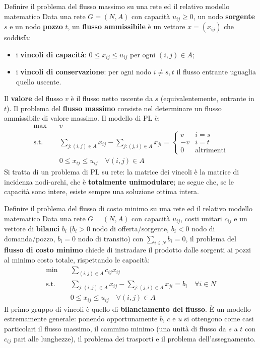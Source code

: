 \documentclass[12pt]{extarticle} %
\begin{document}
\begin{teoriabox}{Definire il problema del flusso massimo su una rete ed il relativo modello matematico}
Data una rete $G=(N,A)$ con capacità $u_{ij} \ge 0$, un nodo \textbf{sorgente} $s$ e un nodo \textbf{pozzo} $t$, un \textbf{flusso ammissibile} è un vettore $x = (x_{ij})$ che soddisfa:
\begin{itemize}
    \item i \textbf{vincoli di capacità}: $0 \le x_{ij} \le u_{ij}$ per ogni $(i,j) \in A$;
    \item i \textbf{vincoli di conservazione}: per ogni nodo $i \ne s,t$ il flusso entrante uguaglia quello uscente.
\end{itemize}
Il \textbf{valore} del flusso $v$ è il flusso netto uscente da $s$ (equivalentemente, entrante in $t$). Il problema del \textbf{flusso massimo} consiste nel determinare un flusso ammissibile di valore massimo. Il modello di PL è:
\[
\begin{aligned}
\max \quad & v \\
\text{s.t.} \quad & \sum_{j:(i,j)\in A} x_{ij} - \sum_{j:(j,i)\in A} x_{ji} =
\begin{cases}
v & i = s\\
-v & i = t\\
0 & \text{altrimenti}
\end{cases} \\
& 0 \le x_{ij} \le u_{ij} \quad \forall (i,j) \in A
\end{aligned}
\]
Si tratta di un problema di PL su rete: la matrice dei vincoli è la matrice di incidenza nodi-archi, che è \textbf{totalmente unimodulare}; ne segue che, se le capacità sono intere, esiste sempre una soluzione ottima intera.
\end{teoriabox}

\begin{teoriabox}{Definire il problema del flusso di costo minimo su una rete ed il relativo modello matematico}
Data una rete $G=(N,A)$ con capacità $u_{ij}$, costi unitari $c_{ij}$ e un vettore di \textbf{bilanci} $b_i$ ($b_i > 0$ nodo di offerta/sorgente, $b_i < 0$ nodo di domanda/pozzo, $b_i = 0$ nodo di transito) con $\sum_{i\in N} b_i = 0$, il problema del \textbf{flusso di costo minimo} chiede di instradare il prodotto dalle sorgenti ai pozzi al minimo costo totale, rispettando le capacità:
\[
\begin{aligned}
\min \quad & \sum_{(i,j)\in A} c_{ij}x_{ij} \\
\text{s.t.} \quad & \sum_{j:(i,j)\in A} x_{ij} - \sum_{j:(j,i)\in A} x_{ji} = b_i \quad \forall i \in N \\
& 0 \le x_{ij} \le u_{ij} \quad \forall (i,j)\in A
\end{aligned}
\]
Il primo gruppo di vincoli è quello di \textbf{bilanciamento del flusso}. È un modello estremamente generale: ponendo opportunamente $b$, $c$ e $u$ si ottengono come casi particolari il flusso massimo, il cammino minimo (una unità di flusso da $s$ a $t$ con $c_{ij}$ pari alle lunghezze), il problema dei trasporti e il problema dell'assegnamento.
\end{teoriabox}
\end{document}
